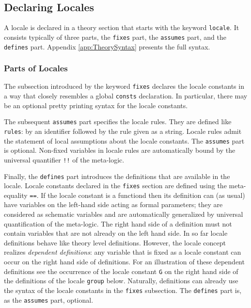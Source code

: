 \subsection{Declaring Locales}

A locale is declared in a theory section that starts with the
keyword \texttt{locale}.  It consists typically of three parts, the
\texttt{fixes} part, the \texttt{assumes} part, and the \texttt{defines} part.
Appendix \ref{app:TheorySyntax} presents the full syntax.

\subsubsection{Parts of Locales}

The subsection introduced by the keyword \texttt{fixes} declares the locale
constants in a way that closely resembles a global \texttt{consts}
declaration.  In particular, there may be an optional pretty printing syntax
for the locale constants.

The subsequent \texttt{assumes} part specifies the locale rules.  They are
defined like \texttt{rules}: by an identifier followed by the rule
given as a string.  Locale rules admit the statement of local assumptions
about the locale constants.  The \texttt{assumes} part is optional.  Non-fixed
variables in locale rules are automatically bound by the universal quantifier
\texttt{!!} of the meta-logic.

Finally, the \texttt{defines} part introduces the definitions that are
available in the locale.  Locale constants declared in the \texttt{fixes}
section are defined using the meta-equality \texttt{==}.  If the
locale constant is a functiond then its definition can (as usual) have
variables on the left-hand side acting as formal parameters; they are
considered as schematic variables and are automatically generalized by
universal quantification of the meta-logic.  The right hand side of a
definition must not contain variables that are not already on the left hand
side.  In so far locale definitions behave like theory level definitions.
However, the locale concept realizes \emph{dependent definitions}: any variable
that is fixed as a locale constant can occur on the right hand side of
definitions.  For an illustration of these dependent definitions see the
occurrence of the locale constant \texttt{G} on the right hand side of the
definitions of the locale \texttt{group} below.  Naturally, definitions can
already use the syntax of the locale constants in the \texttt{fixes}
subsection.  The \texttt{defines} part is, as the \texttt{assumes} part,
optional.

